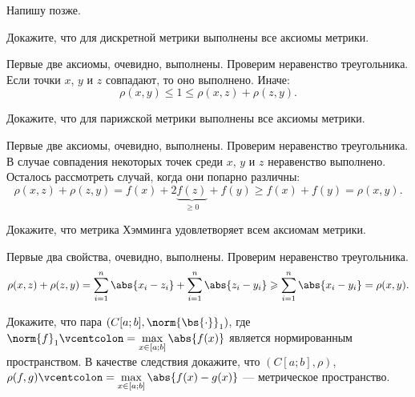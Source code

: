 \begin{solution}
    Напишу позже.
\end{solution}

\begin{problem}[35$^\circ$]
    Докажите, что для дискретной метрики выполнены все аксиомы метрики.
\end{problem}

\begin{solution}
    Первые две аксиомы, очевидно, выполнены. Проверим неравенство треугольника. Если точки $x$, $y$ и $z$ совпадают, то оно выполнено. Иначе:
    \[
        \rho(x, y) \leqslant 1 \leqslant \rho(x, z) + \rho(z, y).
    \]
\end{solution}

\begin{problem}[36$^\circ$]
    Докажите, что для парижской метрики выполнены все аксиомы метрики.
\end{problem}

\begin{solution}
    Первые две аксиомы, очевидно, выполнены. Проверим неравенство треугольника. В случае совпадения некоторых точек среди $x$, $y$ и $z$ неравенство выполнено. Осталось рассмотреть случай, когда они попарно различны:
    \[
        \rho(x, z) + \rho(z, y) = f(x) + 2\underbrace{f(z)}_{\geqslant 0} + f(y) \geqslant f(x) + f(y) = \rho(x, y).
    \]
\end{solution}

\begin{problem}[37$^\circ$]
    Докажите, что метрика Хэмминга удовлетворяет всем аксиомам метрики.
\end{problem}

\begin{solution}
    Первые два свойства, очевидно, выполнены. Проверим неравенство треугольника.
    \[
        \rho(x, z) + \rho(z, y) = \sum_{i = 1}^n\abs{x_i - z_i} + \sum_{i = 1}^n\abs{z_i - y_i} \geqslant \sum_{i = 1}^n\abs{x_i - y_i} = \rho(x, y).
    \]
\end{solution}

\begin{problem}[39$^\circ$]
    Докажите, что пара $(C[a; b], \norm{\bs{\cdot}}_1)$, где $\norm{f}_1 \vcentcolon = \max\limits_{x \in [a; b]}\abs{f(x)}$ является нормированным пространством. В качестве следствия докажите, что $(C[a; b], \rho)$, $\rho(f, g) \vcentcolon = \max\limits_{x \in [a; b]}\abs{f(x) - g(x)}$ --- метрическое пространство.
\end{problem}

